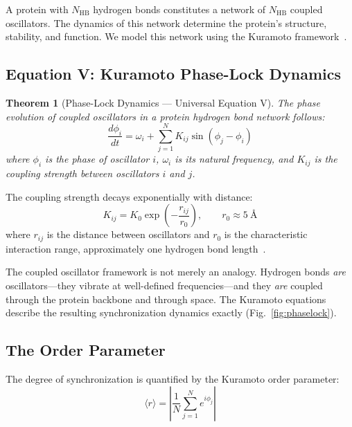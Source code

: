 \documentclass[aps,prx,superscriptaddress,twocolumn,10pt,a4paper,longbibliography,preprint]{revtex4-2}
\newcommand{\orderp}{\langle r \rangle}
\newtheorem{theorem}{Theorem}[section]
\theoremstyle{definition}
\theoremstyle{remark}
\begin{document}
A protein with $N_{\text{HB}}$ hydrogen bonds constitutes a network of $N_{\text{HB}}$ coupled oscillators. The dynamics of this network determine the protein's structure, stability, and function. We model this network using the Kuramoto framework~\cite{Kuramoto1984, Pikovsky2001, Strogatz2000}.

\subsection{Equation V: Kuramoto Phase-Lock Dynamics}

\begin{theorem}[Phase-Lock Dynamics --- Universal Equation V]
\label{thm:kuramoto}
The phase evolution of coupled oscillators in a protein hydrogen bond network follows:
\begin{equation}
\boxed{\frac{d\phi_i}{dt} = \omega_i + \sum_{j=1}^{N} K_{ij} \sin(\phi_j - \phi_i)}
\label{eq:kuramoto}
\end{equation}
where $\phi_i$ is the phase of oscillator $i$, $\omega_i$ is its natural frequency, and $K_{ij}$ is the coupling strength between oscillators $i$ and $j$.
\end{theorem}

The coupling strength decays exponentially with distance:
\begin{equation}
K_{ij} = K_0 \exp\left(-\frac{r_{ij}}{r_0}\right), \qquad r_0 \approx 5~\text{\AA}
\label{eq:coupling}
\end{equation}
where $r_{ij}$ is the distance between oscillators and $r_0$ is the characteristic interaction range, approximately one hydrogen bond length~\cite{Sachikonye2026a}.

The coupled oscillator framework is not merely an analogy. Hydrogen bonds \emph{are} oscillators---they vibrate at well-defined frequencies---and they \emph{are} coupled through the protein backbone and through space. The Kuramoto equations describe the resulting synchronization dynamics exactly (Fig.~\ref{fig:phaselock}).

\subsection{The Order Parameter}

The degree of synchronization is quantified by the Kuramoto order parameter:
\begin{equation}
\orderp = \left| \frac{1}{N} \sum_{j=1}^{N} e^{i\phi_j} \right|
\label{eq:order_parameter}
\end{equation}
\end{document}
